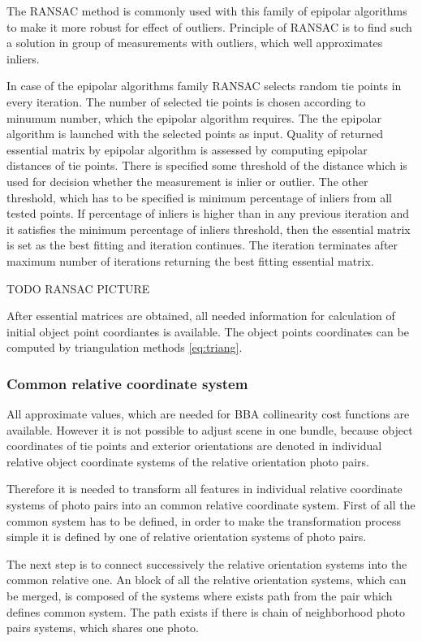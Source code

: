 \documentclass[a4paper,12pt]{article}
\begin{document}
The RANSAC \cite{RANSAC} method is commonly used with this family of epipolar algorithms to 
make it more robust for effect of outliers.
Principle of RANSAC is to find such  a solution in group of measurements with outliers, 
which well approximates inliers.  

In case of the epipolar algorithms family RANSAC selects random tie points in every iteration.
The number of selected tie points is chosen according to minumum number, which the epipolar algorithm requires.
The the epipolar algorithm is launched with the selected points as input. 
Quality of returned essential matrix by epipolar algorithm is assessed by 
computing epipolar distances of tie points. There is specified some threshold of the distance which is used 
for decision whether the measurement is inlier or outlier. The other threshold, which has to be specified 
is minimum percentage of inliers from all tested points. If percentage of inliers is higher than in any previous iteration
and it satisfies the minimum percentage of inliers threshold, then
the essential matrix is set as the best fitting and iteration continues. The iteration terminates after 
maximum number of iterations returning the best fitting essential matrix.

TODO RANSAC PICTURE

After essential matrices are obtained, all needed information for calculation of initial object point coordiantes
is  available. The object points coordinates can be computed by triangulation methods \ref{eq:triang}.

\subsubsection{Common relative coordinate system}

All approximate values, which are needed for BBA collinearity cost functions are available. 
However it is not possible to adjust scene in one bundle, because
object coordinates of tie points and exterior orientations are denoted in  individual relative object coordinate systems
of the relative orientation photo pairs.

Therefore it is needed to transform all features in individual relative coordinate systems of photo pairs into 
an common relative coordinate system. First of all the common system has to be defined,
in order to make the transformation process simple it is defined by one of  relative orientation systems of photo pairs.

The next step is to connect successively the relative orientation systems into the common relative one.  
An block of all the relative orientation systems, which can be merged, is composed of the systems 
where exists path from the pair which defines common system.
The path exists if there is chain of neighborhood photo pairs systems, which 
shares one photo.
\end{document}
